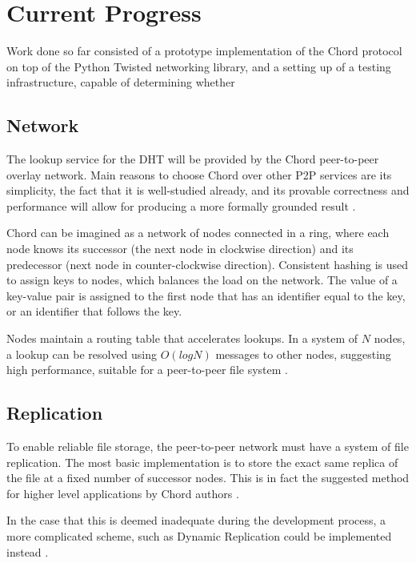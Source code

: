 \documentclass[8pt,a4paper]{article}
\begin{document}
\section{Current Progress}

Work done so far consisted of a prototype implementation of the Chord protocol on top of the Python Twisted networking library, and a setting up of a testing infrastructure, capable of determining whether 
\subsection{Network}
The lookup service for the DHT will be provided by the Chord peer-to-peer overlay network. Main reasons to choose Chord over other P2P services are its simplicity, the fact that it is well-studied already, and its provable correctness and performance will allow for producing a more formally grounded result \cite{chord}. %

Chord can be imagined as a network of nodes connected in a ring, where each node knows its successor (the next node in clockwise direction) and its predecessor (next node in counter-clockwise direction). Consistent hashing is used to assign keys to nodes, which balances the load on the network. The value of a key-value pair is assigned to the first node that has an identifier equal to the key, or an identifier that follows the key. 

Nodes maintain a routing table that accelerates lookups. In a system of $N$ nodes, a lookup can be resolved using $O(log N)$ messages to other nodes, suggesting high performance, suitable for a peer-to-peer file system \cite{chord}.

\subsection{Replication}
To enable reliable file storage, the peer-to-peer network must have a system of file replication. The most basic implementation is to store the exact same replica of the file at a fixed number of successor nodes. This is in fact the suggested method for higher level applications by Chord authors \cite{chord}.

In the case that this is deemed inadequate during the development process, a more complicated scheme, such as Dynamic Replication could be implemented instead \cite{dhash}.
\end{document}
